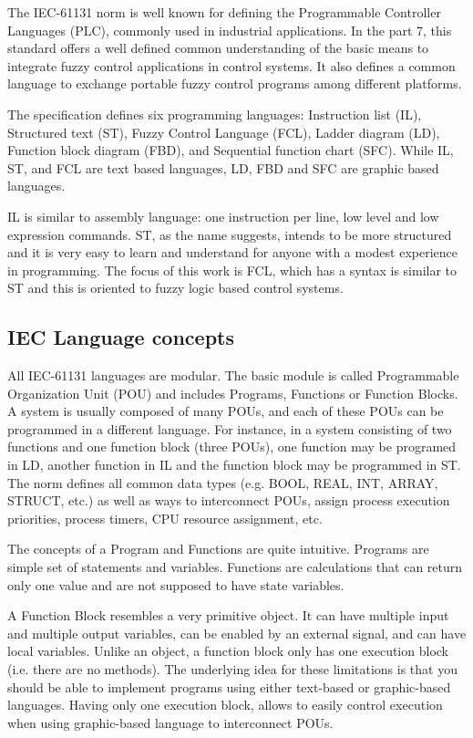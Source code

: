 \documentclass[11pt,twoside]{article}
\begin{document}
\begin{multicols}{2}
The IEC-61131 norm is well known for defining the Programmable Controller Languages (PLC), commonly used in industrial applications.
In the part 7, this standard offers a well defined common understanding of the basic means to integrate fuzzy control applications in control systems.
It also defines a common language to exchange portable fuzzy control programs among different platforms.

The specification defines six programming languages: Instruction list (IL), Structured text (ST), Fuzzy Control Language (FCL), Ladder diagram (LD), Function block diagram (FBD), and Sequential function chart (SFC). 
While IL, ST, and FCL are text based languages, LD, FBD and SFC are graphic based languages.

IL is similar to assembly language: one instruction per line, low level and low expression commands. 
ST, as the name suggests, intends to be more structured and it is very easy to learn and understand for anyone with a modest experience in programming. 
The focus of this work is FCL, which has a syntax is similar to ST and this is oriented to fuzzy logic based control systems.

\subsection{IEC Language concepts \label{sec:IecConcepts}}

All IEC-61131 languages are modular. 
The basic module is called Programmable Organization Unit (POU) and includes Programs, Functions or Function Blocks. 
A system is usually composed of many POUs, and each of these POUs can be programmed in a different language. 
For instance, in a system consisting of two functions and one function block (three POUs), one function may be programed in LD, another function in IL and the function block may be programmed in ST. 
The norm defines all common data types (e.g. BOOL, REAL, INT, ARRAY, STRUCT, etc.) as well as ways to interconnect POUs, assign process execution priorities, process timers, CPU resource assignment, etc.

The concepts of a Program and Functions are quite intuitive.
Programs are simple set of statements and variables.
Functions are calculations that can return only one value and are not supposed to have state variables.

A Function Block resembles a very primitive object.
It can have multiple input and multiple output variables, can be enabled by an external signal, and can have local variables.
Unlike an object, a function block only has one execution block (i.e. there are no methods).
The underlying idea for these limitations is that you should be able to implement programs using either text-based or graphic-based languages.
Having only one execution block, allows to easily control execution when using graphic-based language to interconnect POUs.


\end{multicols}
\end{document}
